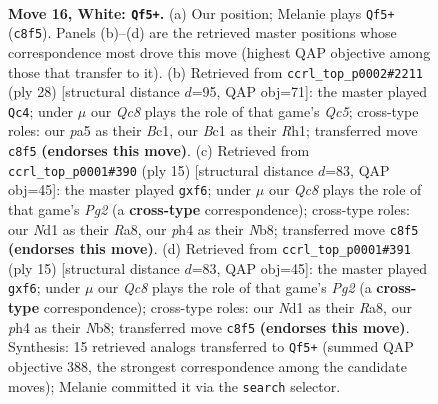 \documentclass[11pt]{article}
\begin{document}
\clearpage

\begin{figure}[p]\centering
\begin{subfigure}{0.46\textwidth}\centering
\resizebox{\linewidth}{!}{%
\newchessgame
\chessboard[
  setfen={rnQ2bnr/4qkp1/2p5/pp1p2P1/3P3p/5B1P/PPP2P2/R1BN1RK1 w - - 2 16},
  showmover=false,
  pgfstyle=straightmove, color=movearrow, markmove={c8-f5}
]}
\caption{}
\end{subfigure}\hfill
\begin{subfigure}{0.46\textwidth}\centering
\resizebox{\linewidth}{!}{%
\newchessgame
\chessboard[
  setfen={r1bq2k1/pp4pp/2n1p3/2Qn1r2/5p2/2P2N2/PP2BPPP/R1B1K2R w KQ - 2 15},
  showmover=false,
  pgfstyle=straightmove, color=movearrow, markmove={c5-c4}
]}
\caption{}
\end{subfigure}
\\[4pt]
\begin{subfigure}{0.46\textwidth}\centering
\resizebox{\linewidth}{!}{%
\newchessgame
\chessboard[
  setfen={rnb1kb1r/pp3ppp/4pB2/q7/2pNP3/2N5/PP3PPP/R2QKB1R b KQkq - 0 8},
  showmover=false,
  pgfstyle=straightmove, color=movearrow, markmove={g7-f6}
]}
\caption{}
\end{subfigure}\hfill
\begin{subfigure}{0.46\textwidth}\centering
\resizebox{\linewidth}{!}{%
\newchessgame
\chessboard[
  setfen={rnb1kb1r/pp3ppp/4pB2/q7/2pNP3/2N5/PP3PPP/R2QKB1R b KQkq - 0 8},
  showmover=false,
  pgfstyle=straightmove, color=movearrow, markmove={g7-f6}
]}
\caption{}
\end{subfigure}
\caption{\textbf{Move 16, White: \texttt{Qf5+}.} (a) Our position; Melanie plays \texttt{Qf5+} (\texttt{c8f5}). Panels (b)--(d) are the retrieved master positions whose correspondence most drove this move (highest QAP objective among those that transfer to it). (b) Retrieved from \texttt{ccrl\_top\_p0002\#2211} (ply 28) [structural distance $d$=95, QAP obj=71]: the master played \texttt{Qc4}; under $\mu$ our \emph{Qc8} plays the role of that game's \emph{Qc5}; cross-type roles: our \emph{p}a5 as their \emph{B}c1, our \emph{B}c1 as their \emph{R}h1; transferred move \texttt{c8f5} \textbf{(endorses this move)}. (c) Retrieved from \texttt{ccrl\_top\_p0001\#390} (ply 15) [structural distance $d$=83, QAP obj=45]: the master played \texttt{gxf6}; under $\mu$ our \emph{Qc8} plays the role of that game's \emph{Pg2} (a \textbf{cross-type} correspondence); cross-type roles: our \emph{N}d1 as their \emph{R}a8, our \emph{p}h4 as their \emph{N}b8; transferred move \texttt{c8f5} \textbf{(endorses this move)}. (d) Retrieved from \texttt{ccrl\_top\_p0001\#391} (ply 15) [structural distance $d$=83, QAP obj=45]: the master played \texttt{gxf6}; under $\mu$ our \emph{Qc8} plays the role of that game's \emph{Pg2} (a \textbf{cross-type} correspondence); cross-type roles: our \emph{N}d1 as their \emph{R}a8, our \emph{p}h4 as their \emph{N}b8; transferred move \texttt{c8f5} \textbf{(endorses this move)}. Synthesis: 15 retrieved analogs transferred to \texttt{Qf5+} (summed QAP objective 388, the strongest correspondence among the candidate moves); Melanie committed it via the \texttt{search} selector.}
\label{fig:thought-m30}
\end{figure}
\end{document}
